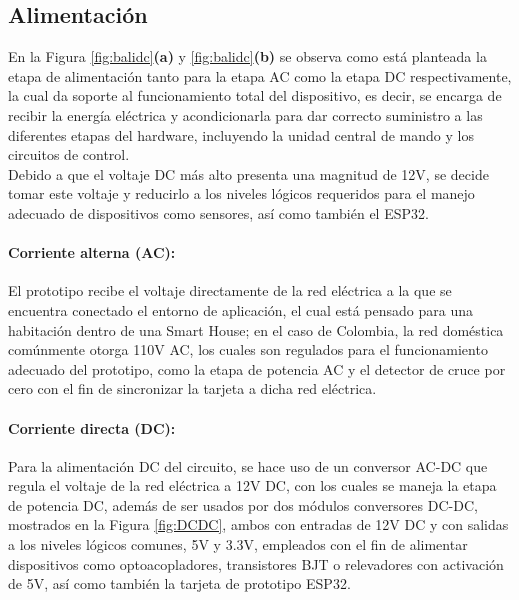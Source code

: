 	\subsection{Alimentación}
	
	En la Figura \ref{fig:balidc}\textbf{(a)} y \ref{fig:balidc}\textbf{(b)} se observa como está planteada la etapa de alimentación tanto para la etapa AC como la etapa DC respectivamente, la cual da soporte al funcionamiento total del dispositivo, es decir, se encarga de recibir la energía eléctrica y acondicionarla para dar correcto suministro a las diferentes etapas del hardware, incluyendo la unidad central de mando y los circuitos de control.\\
	
	Debido a que el voltaje DC más alto presenta una magnitud de 12V, se decide tomar este voltaje y reducirlo a los niveles lógicos requeridos para el manejo adecuado de dispositivos como sensores, así como también el ESP32. \\
	
	\paragraph{Corriente alterna (AC):}
		El prototipo recibe el voltaje directamente de la red eléctrica a la que se encuentra conectado el entorno de aplicación, el cual está pensado para una habitación dentro de una Smart House; en el caso de Colombia, la red doméstica comúnmente otorga 110V AC, los cuales son regulados para el funcionamiento adecuado del prototipo, como la etapa de potencia AC y el detector de cruce por cero con el fin de sincronizar la tarjeta a dicha red eléctrica.\\
	
	\paragraph{Corriente directa (DC):}
	Para la alimentación DC del circuito, se hace uso de un conversor AC-DC que regula el voltaje de la red eléctrica a 12V DC, con los cuales se maneja la etapa de potencia DC, además de ser usados por dos módulos conversores DC-DC, mostrados en la Figura \ref{fig:DCDC}, ambos con entradas de 12V DC y con salidas a los niveles lógicos comunes, 5V y 3.3V, empleados con el fin de alimentar dispositivos como optoacopladores, transistores BJT o relevadores con activación de 5V, así como también la tarjeta de prototipo ESP32.\\
	
